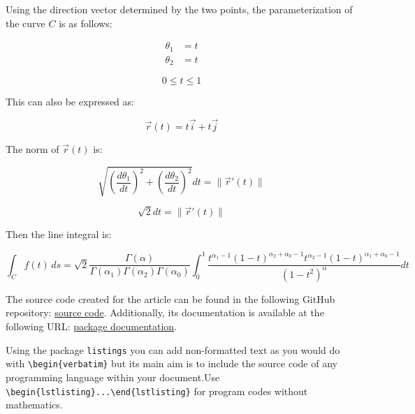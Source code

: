 \documentclass[AMA,Times1COL]{WileyNJDv5} %
\begin{document}
Using the direction vector determined by the two points, the parameterization of the curve $C$ is as follows:

\begin{align*}
    \theta_1 &= t \\
    \theta_2 &= t 
\end{align*}

\begin{equation*}
    0 \leq t \leq 1
\end{equation*}

This can also be expressed as:

\begin{equation*}
    \vec{r}(t) = t\vec{i} + t\vec{j}
\end{equation*}

The norm of $\vec{r}(t)$ is:

\begin{equation*}
    \sqrt{\left(\frac{d\theta_1}{dt}\right)^2+\left(\frac{d\theta_2}{dt}\right)^2} dt = \|\vec{r}'(t)\|
\end{equation*}

\begin{equation*}
    \sqrt{2} dt = \|\vec{r}'(t)\|
\end{equation*}

Then the line integral is:

\begin{equation*}
    \int_C f(t) \, ds = \sqrt{2} \dfrac{\Gamma(\alpha)}{\Gamma(\alpha_1)\Gamma(\alpha_2)\Gamma(\alpha_0)} \int_0^{1} \frac{t^{\alpha_1-1}(1-t)^{\alpha_2+\alpha_0-1}t^{\alpha_2-1}(1-t)^{\alpha_1+\alpha_0-1}}{(1-t^2)^\alpha} dt
\end{equation*}
\vspace{0.5cm}



The source code created for the article can be found in the following GitHub repository: \href{https://github.com/torodriguezt/BayesianPairedSamples}{source code}. Additionally, its documentation is available at the following URL: \href{https://torodriguezt.github.io/BayesianPairedSamples/}{package documentation}.


\vspace*{12pt}
Using the package {\tt listings} you can add non-formatted text as you would do with \verb|\begin{verbatim}| but its main aim is to include the source code of any programming language within your document.\newline Use \verb|\begin{lstlisting}...\end{lstlisting}| for program codes without mathematics.
\end{document}
